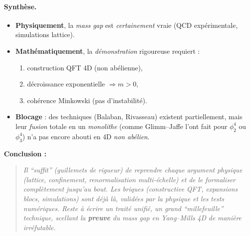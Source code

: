 \documentclass[11pt]{article}
\begin{document}
\paragraph{Synthèse.}
\begin{itemize}
  \item \textbf{Physiquement}, la \emph{mass gap} est \emph{certainement} vraie (QCD expérimentale, simulations lattice).
  \item \textbf{Mathématiquement}, la \emph{démonstration} rigoureuse requiert :
    \begin{enumerate}
      \item construction QFT 4D (non abélienne),
      \item décroissance exponentielle $\Rightarrow m>0$,
      \item cohérence Minkowski (pas d'instabilité).
    \end{enumerate}
  \item \textbf{Blocage} : des techniques (Balaban, Rivasseau) existent partiellement, mais leur \emph{fusion} totale en un \emph{monolithe} (comme Glimm--Jaffe l'ont fait pour $\phi^4_2$ ou $\phi^4_3$) n'a pas encore abouti en 4D \emph{non abélien}.
\end{itemize}

\noindent
\textbf{Conclusion :} 
\begin{quote}
\em
Il “suffit” (guillemets de rigueur) de reprendre \emph{chaque} argument physique (lattice, confinement, renormalisation multi-échelle) et de le formaliser \emph{complètement} jusqu'au bout. Les briques (constructive QFT, expansions blocs, simulations) sont \emph{déjà} là, validées par la physique et les tests numériques. Reste à écrire un \emph{traité unifié}, un grand “millefeuille” technique, scellant la \textbf{preuve} du mass gap en Yang--Mills 4D de manière irréfutable.
\end{quote}
\end{document}
